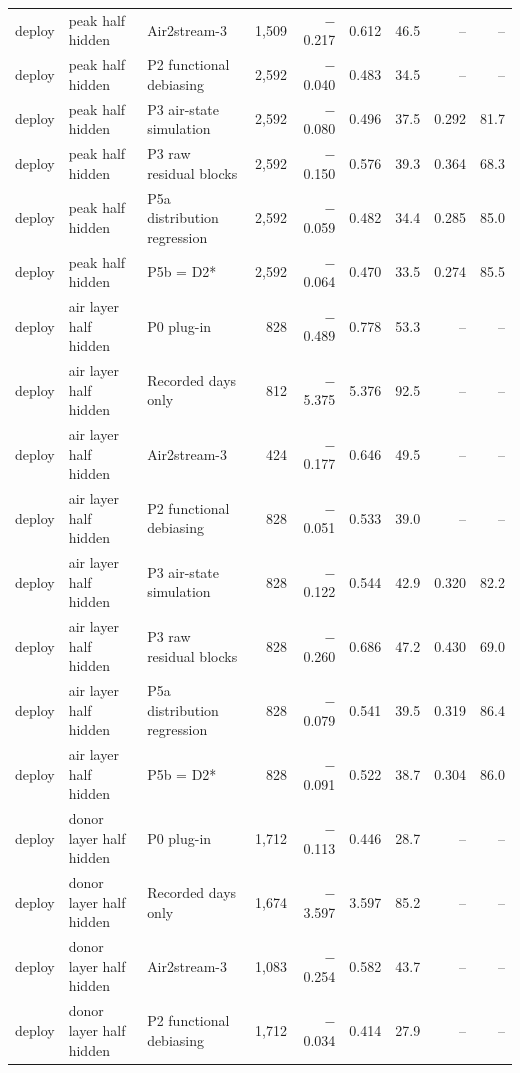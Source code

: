 \begin{table}
{\begin{tabular}{lllrrrrrr}
deploy & peak half hidden & Air2stream-3 & 1{,}509 & \ensuremath{-}0.217 & 0.612 & 46.5 & -- & -- \\
deploy & peak half hidden & P2 functional debiasing & 2{,}592 & \ensuremath{-}0.040 & 0.483 & 34.5 & -- & -- \\
deploy & peak half hidden & P3 air-state simulation & 2{,}592 & \ensuremath{-}0.080 & 0.496 & 37.5 & 0.292 & 81.7 \\
deploy & peak half hidden & P3 raw residual blocks & 2{,}592 & \ensuremath{-}0.150 & 0.576 & 39.3 & 0.364 & 68.3 \\
deploy & peak half hidden & P5a distribution regression & 2{,}592 & \ensuremath{-}0.059 & 0.482 & 34.4 & 0.285 & 85.0 \\
deploy & peak half hidden & P5b = D2* & 2{,}592 & \ensuremath{-}0.064 & 0.470 & 33.5 & 0.274 & 85.5 \\
deploy & air layer half hidden & P0 plug-in & 828 & \ensuremath{-}0.489 & 0.778 & 53.3 & -- & -- \\
deploy & air layer half hidden & Recorded days only & 812 & \ensuremath{-}5.375 & 5.376 & 92.5 & -- & -- \\
deploy & air layer half hidden & Air2stream-3 & 424 & \ensuremath{-}0.177 & 0.646 & 49.5 & -- & -- \\
deploy & air layer half hidden & P2 functional debiasing & 828 & \ensuremath{-}0.051 & 0.533 & 39.0 & -- & -- \\
deploy & air layer half hidden & P3 air-state simulation & 828 & \ensuremath{-}0.122 & 0.544 & 42.9 & 0.320 & 82.2 \\
deploy & air layer half hidden & P3 raw residual blocks & 828 & \ensuremath{-}0.260 & 0.686 & 47.2 & 0.430 & 69.0 \\
deploy & air layer half hidden & P5a distribution regression & 828 & \ensuremath{-}0.079 & 0.541 & 39.5 & 0.319 & 86.4 \\
deploy & air layer half hidden & P5b = D2* & 828 & \ensuremath{-}0.091 & 0.522 & 38.7 & 0.304 & 86.0 \\
deploy & donor layer half hidden & P0 plug-in & 1{,}712 & \ensuremath{-}0.113 & 0.446 & 28.7 & -- & -- \\
deploy & donor layer half hidden & Recorded days only & 1{,}674 & \ensuremath{-}3.597 & 3.597 & 85.2 & -- & -- \\
deploy & donor layer half hidden & Air2stream-3 & 1{,}083 & \ensuremath{-}0.254 & 0.582 & 43.7 & -- & -- \\
deploy & donor layer half hidden & P2 functional debiasing & 1{,}712 & \ensuremath{-}0.034 & 0.414 & 27.9 & -- & -- \\

\end{tabular}}
\end{table}
